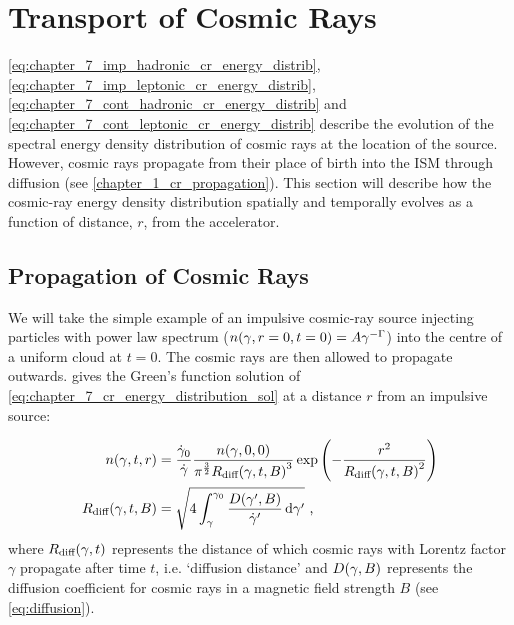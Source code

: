 \section{Transport of Cosmic Rays} \label{sec:chapter_7_cr_SED_trans} 

\autoref{eq:chapter_7_imp_hadronic_cr_energy_distrib}, \autoref{eq:chapter_7_imp_leptonic_cr_energy_distrib}, \autoref{eq:chapter_7_cont_hadronic_cr_energy_distrib} and \autoref{eq:chapter_7_cont_leptonic_cr_energy_distrib} describe the evolution of the spectral energy density distribution of cosmic rays at the location of the source. However, cosmic rays propagate from their place of birth into the ISM through diffusion (see \autoref{chapter_1_cr_propagation}). This section will describe how the cosmic-ray energy density distribution spatially and temporally evolves as a function of distance, $r$, from the accelerator.

\subsection{Propagation of Cosmic Rays}

We will take the simple example of an impulsive cosmic-ray source injecting particles with power law spectrum ($n\qty(\gamma,r=0,t=0)=A\gamma^{-\Gamma}$) into the centre of a uniform cloud at $t=0$. The cosmic rays are then allowed to propagate outwards. \cite{1995PhRvD..52.3265A} gives the Green's function solution of \autoref{eq:chapter_7_cr_energy_distribution_sol} at a distance $r$ from an impulsive source:

\begin{subequations}
	\begin{align}
	n\qty(\gamma,t,r)&=\frac{\dot{\gamma}_0}{\dot{\gamma}}\frac{n\qty(\gamma,0,0)}{\pi^{\frac{3}{2}}R_\text{diff}\qty(\gamma,t,B)^3}\exp\qty(-\frac{r^2}{R_\text{diff}\qty(\gamma,t,B)^2}) \label{eq:chapter_7_cr_ev_green_solution} \\
	R_\text{diff}\qty(\gamma,t,B)&=\sqrt{4\int_\gamma^{\gamma_0}\frac{D\qty(\gamma',B)}{\dot{\gamma}'}\dd{\gamma'}}\text{ ,} \label{eq:chapter_7_R_ev_green_solution}
	\end{align}
\end{subequations}  
\noindent where $R_\text{diff}\qty(\gamma,t)$ represents the distance of which cosmic rays with Lorentz factor $\gamma$ propagate after time $t$, i.e. `diffusion distance' and $D\qty(\gamma,B)$ represents the diffusion coefficient for cosmic rays in a magnetic field strength $B$ (see \autoref{eq:diffusion}).

